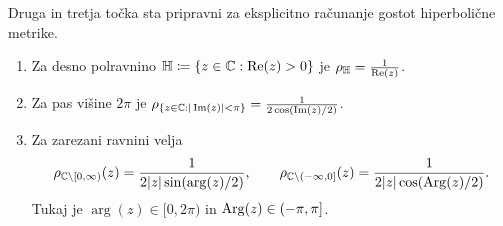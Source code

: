 \noindent Druga in tretja točka sta pripravni za eksplicitno računanje gostot hiperbolične metrike.

\begin{trditev} \label{prop:hypexamples} \mbox{}
    \begin{enumerate}
        \item Za desno polravnino \(\mathbb H \coloneq \{ z \in \mathbb C : \operatorname{Re} (z) > 0 \}\)
         je \(\rho_\mathbb H = \frac{1}{\operatorname{Re} (z)}\).
        \item Za pas višine \(2 \pi\) je \(\rho_{\{z \in \mathbb C : |\operatorname{Im} (z)| < \pi\}} = \frac{1}{2 \cos (\operatorname{Im} (z) / 2)}\).
        \item Za zarezani ravnini velja
            \[
                \rho_{\mathbb C \setminus [0, \infty)} (z) = \frac{1}{2 |z| \sin (\arg (z) / 2)},
                \qquad
                \rho_{\mathbb C \setminus (-\infty, 0]} (z) = \frac{1}{2 |z| \cos (\operatorname{Arg} (z) / 2)}.
            \]
            Tukaj je \(\arg (z) \in [0, 2 \pi)\) in \(\operatorname{Arg} (z) \in (- \pi, \pi]\).
    \end{enumerate}
\end{trditev}